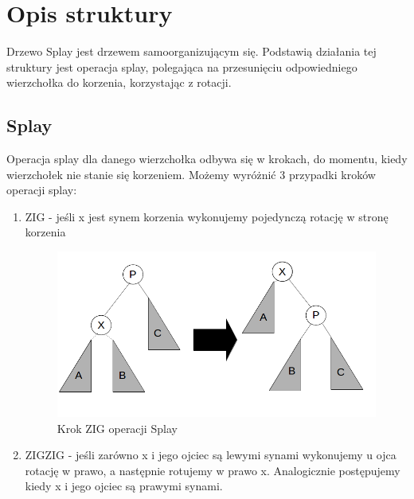 \documentclass[declaration,shortabstract]{iithesis}
\theoremstyle{remark}
\theoremstyle{plain}
\theoremstyle{plain}
\theoremstyle{plain}
\begin{document}
\section{Opis struktury} 

Drzewo Splay jest drzewem samoorganizującym się. Podstawią działania tej struktury jest operacja splay, polegająca na przesunięciu odpowiedniego wierzchołka do korzenia, korzystając z rotacji.  

\subsection{Splay} 

Operacja splay dla danego wierzchołka odbywa się w krokach, do momentu, kiedy wierzchołek nie stanie się korzeniem. Możemy wyróżnić 3 przypadki kroków operacji splay: 
\begin{enumerate} 

\item{ZIG - jeśli x jest synem korzenia wykonujemy pojedynczą rotację w stronę korzenia\\

\begin{figure}
  \centering
    \includegraphics[scale = 0.4]{zig.png}
  \caption{Krok ZIG operacji Splay}
  \label{fig:zig}
\end{figure}}


\item{ZIGZIG - jeśli zarówno x i jego ojciec są lewymi synami wykonujemy u ojca rotację w prawo, a następnie rotujemy w prawo x. Analogicznie postępujemy kiedy x i jego ojciec są prawymi synami.\\

}
\end{enumerate}
\end{document}
